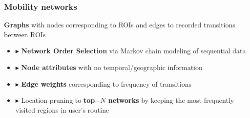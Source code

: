 \documentclass[hyperref={colorlinks = true},unknownkeysallowed]{beamer}
\let\oldcitep=\citep
\renewcommand\citep[1]{\hypersetup{linkcolor=UBCblue}\hyperlink{#1}{\oldcitep{#1}}}
\begin{document}
\begin{frame}
	\frametitle{Mobility networks}
	\begin{tcolorbox}[colback=green!5,colframe=white!40!black]
		\textbf{Graphs} with nodes corresponding to
		ROIs and edges to recorded transitions between ROIs
	\end{tcolorbox}
	\begin{itemize}
		\item $\blacktriangleright$  \textbf{Network Order Selection} via Markov chain modeling of
		sequential data {\footnotesize \citep{scholtes2017network}}
		\item $\blacktriangleright$  \textbf{Node attributes} with no temporal/geographic information
		\item $\blacktriangleright$  \textbf{Edge weights} corresponding to frequency of transitions
		\item  $\blacktriangleright$  Location pruning to \textbf{top$-N$ networks} by keeping the most frequently visited regions in user's routine
	\end{itemize}
\end{frame}
\end{document}
